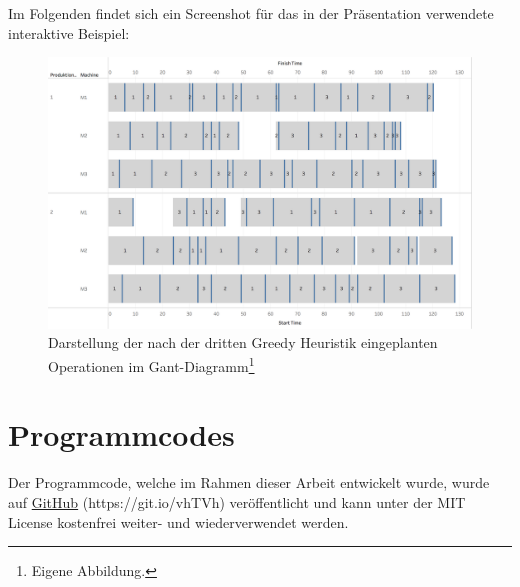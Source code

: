 \documentclass[final, english, ngerman, a4paper, 12pt, %
numbers=noenddot,
cd=true,
cdfont=false,cdfont=nohead,cdfont=nodin,
cdmath=false,
cdhead=false,
cdfoot=true,
cdcover=monochrome,
cdgeometry=symmetric,
declaration=heading,
declaration=notoc,
abstract=heading,
]{tudscrreprt}
\begin{document}
\noindent
Im Folgenden findet sich ein Screenshot für das in der Präsentation verwendete interaktive Beispiel:
\begin{figure}[H]
	\centering
	\includegraphics[width=\textwidth]{./settings/gh3}
	\caption[Interaktives Beispiel - Einplanung nach der dritten Greedy Heuristik]{Darstellung der nach der dritten Greedy Heuristik eingeplanten Operationen im Gant-Diagramm\footnote{Eigene Abbildung.}}\label{fig:gh3}
\end{figure}

\appendix

\chapter{Programmcodes}
Der Programmcode, welche im Rahmen dieser Arbeit entwickelt wurde, wurde auf \href{https://git.io/vhTVh}{GitHub} (https://git.io/vhTVh) veröffentlicht und kann unter der MIT License kostenfrei weiter- und wiederverwendet werden.


\clearpage

\printbibliography

\end{document}
